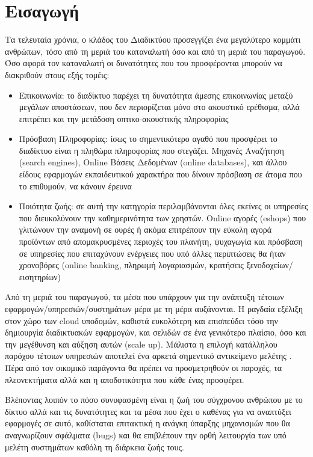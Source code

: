 \chapter{Εισαγωγή}
\label{chapter:intro}

Τα τελευταία χρόνια, ο κλάδος του Διαδικτύου προσεγγίζει ένα μεγαλύτερο κομμάτι ανθρώπων, τόσο από τη μεριά του καταναλωτή 
όσο και από τη μεριά του παραγωγού. Όσο αφορά τον καταναλωτή οι δυνατότητες που του προσφέρονται μπορούν να διακριθούν στους εξής τομέις:

\begin{itemize}
	\item Επικοινωνία: το διαδίκτυο παρέχει τη δυνατότητα άμεσης επικοινωνίας μεταξύ μεγάλων αποστάσεων, που δεν περιορίζεται μόνο στο ακουστικό
			ερέθισμα, αλλά επιτρέπει και την μετάδοση οπτικο-ακουστικής πληροφορίας
	\item Πρόσβαση Πληροφορίας: ίσως το σημεντικότερο αγαθό που προσφέρει το διαδίκτυο είναι η πληθώρα πληροφορίας
			που στεγάζει. Μηχανές Αναζήτηση (search engines), Online Βάσεις Δεδομένων (online databases),
			και άλλου είδους εφαρμογών εκπαιδευτικού χαρακτήρα που δίνουν πρόσβαση σε άτομα που το επιθυμούν, να κάνουν έρευνα
	\item Ποιότητα ζωής: σε αυτή την κατηγορία περιλαμβάνονται όλες εκείνες οι υπηρεσίες που
			διευκολύνουν την καθημερινότητα των χρηστών. Online αγορές (eshops) που γλιτώνουν την αναμονή σε ουρές ή ακόμα
			επιτρέπουν την εύκολη αγορά προϊόντων από απομακρυσμένες περιοχές του πλανήτη, ψυχαγωγία και πρόσβαση σε
			υπηρεσίες που επιταχύνουν ενέργειες που υπό άλλες περιπτώσεις θα ήταν χρονοβόρες (online banking,
			πληρωμή λογαριασμών, κρατήσεις ξενοδοχείων/εισητηρίων)
\end{itemize}

Από τη μεριά του παραγωγού, τα μέσα που υπάρχουν για την ανάπτυξη τέτοιων εφαρμογών/υπηρεσιών/συστημάτων
μέρα με τη μέρα αυξάνονται. Η ραγδαία εξέλιξη στον χώρο των cloud υποδομών, καθιστά ευκολότερη και επισπεύδει
τόσο την δημιουργία διαδικτυακών εφαρμογών, και σελιδών σε ένα γενικότερο πλαίσιο, όσο και την μεγέθυνση και αύξηση αυτών (scale up).
Μάλιστα η επιλογή κατάλληλου παρόχου τέτοιων υπηρεσιών αποτελεί ένα αρκετά σημεντικό αντικείμενο μελέτης \cite{cloud_service_provider_evaluation}.
Πέρα από τον οικομικό παράγοντα θα πρέπει να προσμετρηθούν οι παροχές, τα πλεονεκτήματα αλλά και η αποδοτικότητα που κάθε ένας προσφέρει.

Βλέποντας λοιπόν το πόσο συνυφασμένη είναι η ζωή του σύγχρονου ανθρώπου με το δίκτυο αλλά και τις δυνατότητες και τα μέσα
που έχει ο καθένας για να αναπτύξει εφαρμογές σε αυτό, καθίσταται επιτακτική η ανάγκη ύπαρξης μηχανισμών 
που θα αναγνωρίζουν σφάλματα (bugs) και θα επιβλέπουν την ορθή λειτουργία των υπό μελέτη συστημάτων καθόλη τη διάρκεια ζωής τους.




